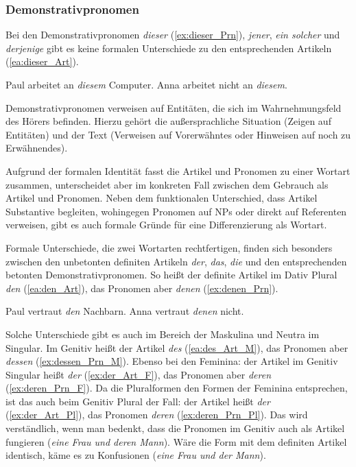 \subsubsection{Demonstrativpronomen}\label{subsubsection:Demonstrativpronomen}

Bei den Demonstrativpronomen \textit{dieser} (\ref{ex:dieser_Prn}), \textit{jener}, \textit{ein solcher} und \textit{derjenige} gibt es keine formalen Unterschiede zu den entsprechenden Artikeln (\ref{ea:dieser_Art}).

\ea \label{ea:DemPrn_DemArt}
\ea \label{ea:dieser_Art} Paul arbeitet an \textit{diesem} Computer.
\ex \label{ex:dieser_Prn} Anna arbeitet nicht an \textit{diesem}.
\z 
\z 

Demonstrativpronomen verweisen auf Entitäten, die sich im Wahrnehmungsfeld des Hörers befinden. Hierzu gehört die außersprachliche Situation (Zeigen auf Entitäten) und der Text (Verweisen auf Vorerwähntes oder Hinweisen auf noch zu Erwähnendes).

Aufgrund der formalen Identität fasst die \citet[729, §1296]{Duden2022} Artikel und Pronomen zu einer Wortart zusammen, unterscheidet aber im konkreten Fall zwischen dem Gebrauch als Artikel und Pronomen. Neben dem funktionalen Unterschied, dass Artikel Substantive begleiten, wohingegen Pronomen auf NPs oder direkt auf Referenten verweisen, gibt es auch formale Gründe für eine Differenzierung als Wortart. 

Formale Unterschiede, die zwei Wortarten rechtfertigen, finden sich besonders zwischen den unbetonten definiten Artikeln \textit{der}, \textit{das}, \textit{die} und den entsprechenden betonten Demonstrativpronomen. So heißt der definite Artikel im Dativ Plural \textit{den} (\ref{ea:den_Art}), das Pronomen aber \textit{denen} (\ref{ex:denen_Prn}).

\ea \label{ea:den_denen}
\ea \label{ea:den_Art} Paul vertraut \textit{den} Nachbarn.
\ex \label{ex:denen_Prn} Anna vertraut \textit{denen} nicht.
\z 
\z 

Solche Unterschiede gibt es auch im Bereich der Maskulina und Neutra im Singular. Im Genitiv heißt der Artikel \textit{des} (\ref{ea:des_Art_M}), das Pronomen aber \textit{dessen} (\ref{ex:dessen_Prn_M}). Ebenso bei den Feminina: der Artikel im Genitiv Singular heißt \textit{der} (\ref{ex:der_Art_F}), das Pronomen aber \textit{deren} (\ref{ex:deren_Prn_F}). Da die Pluralformen den Formen der Feminina entsprechen, ist das auch beim Genitiv Plural der Fall: der Artikel heißt \textit{der} (\ref{ex:der_Art_Pl}), das Pronomen \textit{deren} (\ref{ex:deren_Prn_Pl}). Das wird verständlich, wenn man bedenkt, dass die Pronomen im Genitiv auch als Artikel fungieren (\textit{eine Frau und deren Mann}). Wäre die Form mit dem definiten Artikel identisch, käme es zu Konfusionen (\textit{eine Frau und der Mann}).

